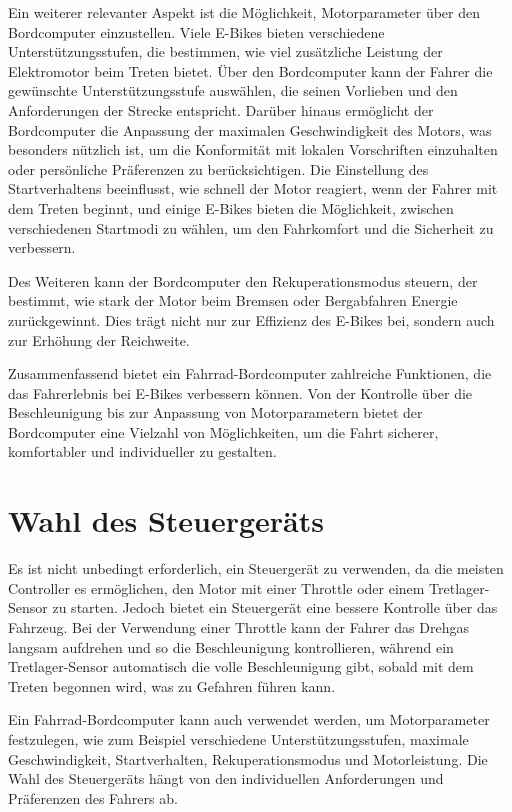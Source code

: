 Ein weiterer relevanter Aspekt ist die Möglichkeit, Motorparameter über den Bordcomputer einzustellen. Viele E-Bikes bieten verschiedene Unterstützungsstufen, die bestimmen, wie viel zusätzliche Leistung der Elektromotor beim Treten bietet. Über den Bordcomputer kann der Fahrer die gewünschte Unterstützungsstufe auswählen, die seinen Vorlieben und den Anforderungen der Strecke entspricht. Darüber hinaus ermöglicht der Bordcomputer die Anpassung der maximalen Geschwindigkeit des Motors, was besonders nützlich ist, um die Konformität mit lokalen Vorschriften einzuhalten oder persönliche Präferenzen zu berücksichtigen. Die Einstellung des Startverhaltens beeinflusst, wie schnell der Motor reagiert, wenn der Fahrer mit dem Treten beginnt, und einige E-Bikes bieten die Möglichkeit, zwischen verschiedenen Startmodi zu wählen, um den Fahrkomfort und die Sicherheit zu verbessern.

Des Weiteren kann der Bordcomputer den Rekuperationsmodus steuern, der bestimmt, wie stark der Motor beim Bremsen oder Bergabfahren Energie zurückgewinnt. Dies trägt nicht nur zur Effizienz des E-Bikes bei, sondern auch zur Erhöhung der Reichweite.

Zusammenfassend bietet ein Fahrrad-Bordcomputer zahlreiche Funktionen, die das Fahrerlebnis bei E-Bikes verbessern können. Von der Kontrolle über die Beschleunigung bis zur Anpassung von Motorparametern bietet der Bordcomputer eine Vielzahl von Möglichkeiten, um die Fahrt sicherer, komfortabler und individueller zu gestalten.

\section{Wahl des Steuergeräts}

Es ist nicht unbedingt erforderlich, ein Steuergerät zu verwenden, da die meisten Controller es ermöglichen, den Motor mit einer Throttle oder einem Tretlager-Sensor zu starten. Jedoch bietet ein Steuergerät eine bessere Kontrolle über das Fahrzeug. Bei der Verwendung einer Throttle kann der Fahrer das Drehgas langsam aufdrehen und so die Beschleunigung kontrollieren, während ein Tretlager-Sensor automatisch die volle Beschleunigung gibt, sobald mit dem Treten begonnen wird, was zu Gefahren führen kann.

Ein Fahrrad-Bordcomputer kann auch verwendet werden, um Motorparameter festzulegen, wie zum Beispiel verschiedene Unterstützungsstufen, maximale Geschwindigkeit, Startverhalten, Rekuperationsmodus und Motorleistung. Die Wahl des Steuergeräts hängt von den individuellen Anforderungen und Präferenzen des Fahrers ab.

